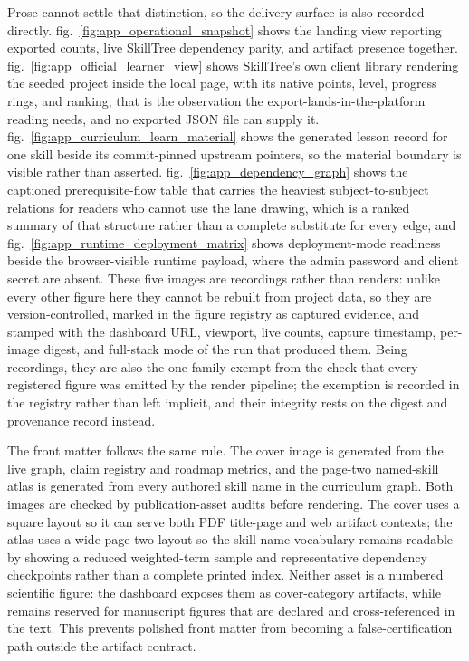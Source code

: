 \documentclass[
  english,
]{article}
\begin{document}
Prose cannot settle that distinction, so the delivery surface is also
recorded directly. fig.~\ref{fig:app_operational_snapshot} shows the
landing view reporting exported counts, live SkillTree dependency
parity, and artifact presence together.
fig.~\ref{fig:app_official_learner_view} shows SkillTree's own client
library rendering the seeded project inside the local page, with its
native points, level, progress rings, and ranking; that is the
observation the export-lands-in-the-platform reading needs, and no
exported JSON file can supply it.
fig.~\ref{fig:app_curriculum_learn_material} shows the generated lesson
record for one skill beside its commit-pinned upstream pointers, so the
material boundary is visible rather than asserted.
fig.~\ref{fig:app_dependency_graph} shows the captioned
prerequisite-flow table that carries the heaviest subject-to-subject
relations for readers who cannot use the lane drawing, which is a ranked
summary of that structure rather than a complete substitute for every
edge, and fig.~\ref{fig:app_runtime_deployment_matrix} shows
deployment-mode readiness beside the browser-visible runtime payload,
where the admin password and client secret are absent. These five images
are recordings rather than renders: unlike every other figure here they
cannot be rebuilt from project data, so they are version-controlled,
marked in the figure registry as captured evidence, and stamped with the
dashboard URL, viewport, live counts, capture timestamp, per-image
digest, and full-stack mode of the run that produced them. Being
recordings, they are also the one family exempt from the check that
every registered figure was emitted by the render pipeline; the
exemption is recorded in the registry rather than left implicit, and
their integrity rests on the digest and provenance record instead.

The front matter follows the same rule. The cover image is generated
from the live graph, claim registry and roadmap metrics, and the
page-two named-skill atlas is generated from every authored skill name
in the curriculum graph. Both images are checked by publication-asset
audits before rendering. The cover uses a square layout so it can serve
both PDF title-page and web artifact contexts; the atlas uses a wide
page-two layout so the skill-name vocabulary remains readable by showing
a reduced weighted-term sample and representative dependency checkpoints
rather than a complete printed index. Neither asset is a numbered
scientific figure: the dashboard exposes them as cover-category
artifacts, while  remains reserved for
manuscript figures that are declared and cross-referenced in the text.
This prevents polished front matter from becoming a false-certification
path outside the artifact contract.
\end{document}
